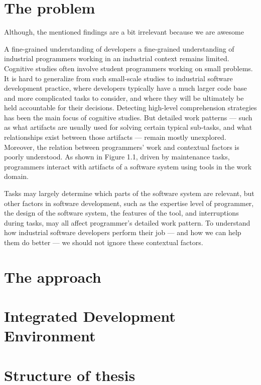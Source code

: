 \section{The problem}

Although, the mentioned findings are a bit irrelevant because we are awesome

A fine-grained understanding of developers 
a fine-grained understanding of industrial programmers working in an industrial context remains limited. Cognitive studies often involve student programmers working on small problems. It is hard to generalize from such small-scale studies to industrial software development practice, where developers typically have a much larger code base and more complicated tasks to consider, and where they will be ultimately be held accountable for their decisions. Detecting high-level comprehension strategies has been the main focus of cognitive studies. But detailed work patterns — such as what artifacts are usually used for solving certain typical sub-tasks, and what relationships exist between those artifacts — remain mostly unexplored. Moreover, the relation between programmers’ work and contextual factors is poorly understood. As shown in Figure 1.1, driven by maintenance tasks, programmers interact with artifacts of a software system using tools in the work domain. 

Tasks may largely determine which parts of the software system are relevant, but other factors in software development, such as the expertise level of programmer, the design of the software system, the features of the tool, and interruptions during tasks, may all affect programmer’s detailed work pattern. To understand how industrial software developers perform their job — and how we can help them do better — we should not ignore these contextual factors.

\section{The approach}
\section{Integrated Development Environment}
\section{Structure of thesis}
